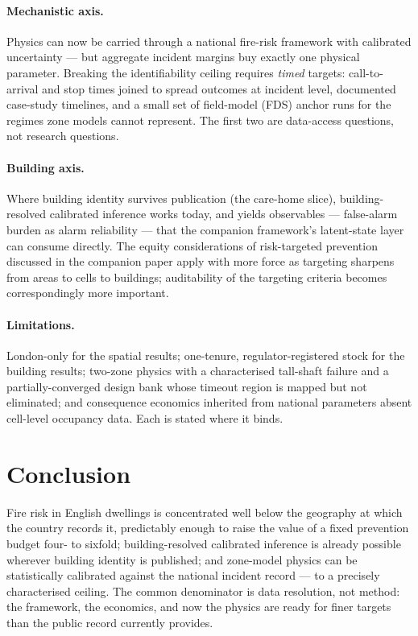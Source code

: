 \documentclass[11pt]{article}
\begin{document}
\paragraph{Mechanistic axis.} Physics can now be carried through a national
fire-risk framework with calibrated uncertainty --- but aggregate incident
margins buy exactly one physical parameter. Breaking the identifiability
ceiling requires \emph{timed} targets: call-to-arrival and stop times joined to
spread outcomes at incident level, documented case-study timelines, and a small
set of field-model (FDS) anchor runs for the regimes zone models cannot
represent. The first two are data-access questions, not research questions.

\paragraph{Building axis.} Where building identity survives publication (the
care-home slice), building-resolved calibrated inference works today, and
yields observables --- false-alarm burden as alarm reliability --- that the
companion framework's latent-state layer can consume directly. The equity
considerations of risk-targeted prevention discussed in the companion paper
apply with more force as targeting sharpens from areas to cells to buildings;
auditability of the targeting criteria becomes correspondingly more important.

\paragraph{Limitations.} London-only for the spatial results; one-tenure,
regulator-registered stock for the building results; two-zone physics with a
characterised tall-shaft failure and a partially-converged design bank whose
timeout region is mapped but not eliminated; and consequence economics inherited
from national parameters absent cell-level occupancy data. Each is stated where
it binds.

\section{Conclusion}

Fire risk in English dwellings is concentrated well below the geography at
which the country records it, predictably enough to raise the value of a fixed prevention budget four- to
sixfold; building-resolved calibrated inference is
already possible wherever building identity is published; and zone-model
physics can be statistically calibrated against the national incident record
--- to a precisely characterised ceiling. The common denominator is data
resolution, not method: the framework, the economics, and now the physics are
ready for finer targets than the public record currently provides.
\end{document}
